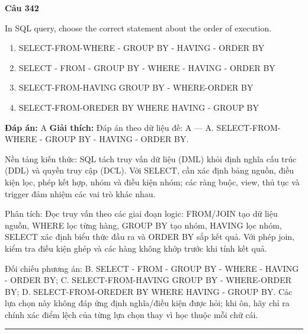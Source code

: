 \documentclass[11pt,a4paper]{article}
\newenvironment{question}[1]{%
  \par\vspace{1em}\noindent\textbf{\large Câu #1}\par\vspace{0.4em}
}{%
  \par\vspace{1em}\hrule\vspace{0.6em}
}
\newenvironment{choices}{%
  \begin{enumerate}[label=\textbf{\Alph*.},leftmargin=2.2em,itemsep=2pt,topsep=3pt]
}{%
  \end{enumerate}
}
\newcommand{\choice}{\item}
\begin{document}
\begin{question}{342}
In SQL query, choose the correct statement about the order of execution.
\begin{choices}
\choice SELECT-FROM-WHERE - GROUP BY - HAVING - ORDER BY
\choice SELECT - FROM - GROUP BY - WHERE - HAVING - ORDER BY
\choice SELECT-FROM-HAVING GROUP BY - WHERE-ORDER BY
\choice SELECT-FROM-OREDER BY WHERE HAVING - GROUP BY
\end{choices}
\textbf{Đáp án:} A
\textbf{Giải thích:} Đáp án theo dữ liệu đề: A — A. SELECT-FROM-WHERE - GROUP BY - HAVING - ORDER BY.

Nền tảng kiến thức: SQL tách truy vấn dữ liệu (DML) khỏi định nghĩa cấu trúc (DDL) và quyền truy cập (DCL). Với SELECT, cần xác định bảng nguồn, điều kiện lọc, phép kết hợp, nhóm và điều kiện nhóm; các ràng buộc, view, thủ tục và trigger đảm nhiệm các vai trò khác nhau.

Phân tích: Đọc truy vấn theo các giai đoạn logic: FROM/JOIN tạo dữ liệu nguồn, WHERE lọc từng hàng, GROUP BY tạo nhóm, HAVING lọc nhóm, SELECT xác định biểu thức đầu ra và ORDER BY sắp kết quả. Với phép join, kiểm tra điều kiện ghép và các hàng không khớp trước khi tính kết quả.

Đối chiếu phương án: B. SELECT - FROM - GROUP BY - WHERE - HAVING - ORDER BY; C. SELECT-FROM-HAVING GROUP BY - WHERE-ORDER BY; D. SELECT-FROM-OREDER BY WHERE HAVING - GROUP BY. Các lựa chọn này không đáp ứng định nghĩa/điều kiện được hỏi; khi ôn, hãy chỉ ra chính xác điểm lệch của từng lựa chọn thay vì học thuộc mỗi chữ cái.
\end{question}
\end{document}
